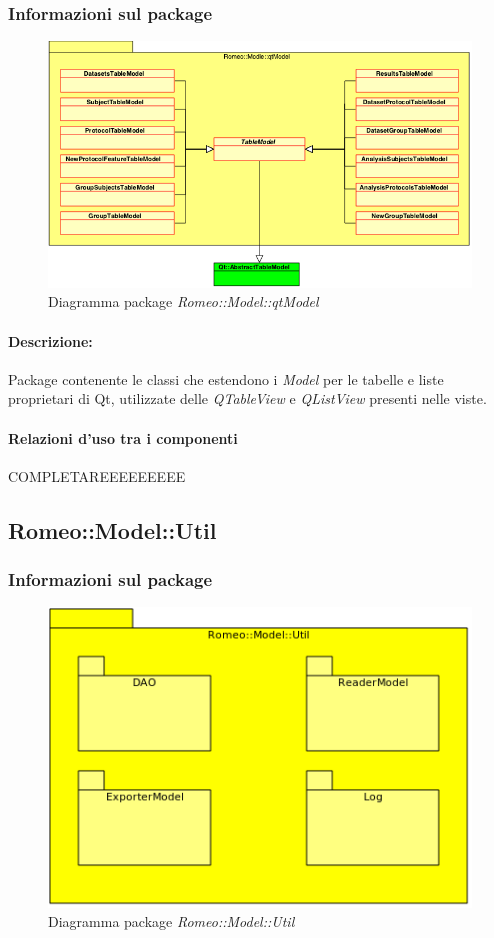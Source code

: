 		\subsubsection{Informazioni sul package}
			\begin{figure}[!h]
				\centering
				\includegraphics[scale=0.5]{./Content/Immagini/Romeo__Model__qtModel.png}
				\caption{Diagramma package \textsl{Romeo::Model::qtModel}}
			\end{figure}
			\paragraph{Descrizione:}Package\g{} contenente le classi che estendono i \textsl{Model} per le tabelle e liste proprietari di Qt\g{}, utilizzate delle \textsl{QTableView} e \textsl{QListView} presenti nelle viste.
			\paragraph{Relazioni d'uso tra i componenti}
COMPLETAREEEEEEEEE	\subsection{Romeo::Model::Util}
		\subsubsection{Informazioni sul package}
			\begin{figure}[!h]
				\centering
				\includegraphics[scale=0.5]{./Content/Immagini/Romeo__Model__Util.png}
				\caption{Diagramma package \textsl{Romeo::Model::Util}}
			\end{figure}
